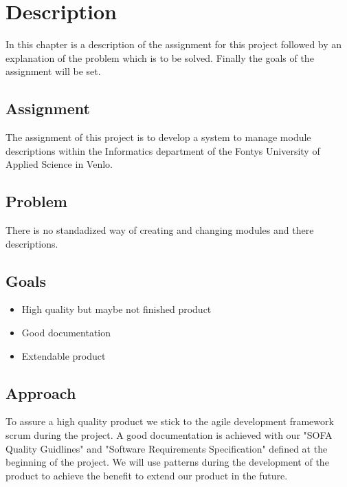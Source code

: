 \chapter{Description}
In this chapter is a description of the assignment for this project followed by an explanation 
of the problem which is to be solved. Finally the goals of the assignment will be set.

\section{Assignment}
The assignment of this project is to develop a system to manage module descriptions within the Informatics
department of the Fontys University of Applied Science in Venlo. 

\section{Problem}
There is no standadized way of creating and changing modules and there descriptions. 

\section{Goals}
\begin{itemize}
    \item High quality but maybe not finished product 
    \item Good documentation
    \item Extendable product
\end{itemize}


\section{Approach}
To assure a high quality product we stick to the agile development framework scrum during the project.
A good documentation is achieved with our "SOFA Quality Guidlines" and "Software Requirements Specification" defined at the beginning of the project.
We will use patterns during the development of the product to achieve the benefit to extend our product in the future. 


